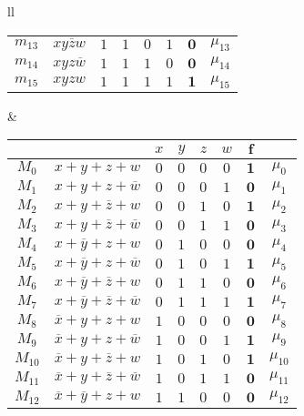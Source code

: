 \documentclass[a4paper]{extarticle}
\begin{document}
\begin{table}[H]
\begin{tabularx}{\textwidth}{ll}
{\begin{tabular}{c|c||cccc||c|c}
          $m_{13}$ & $xy\overline{z}w$ & $1$ & $1$ & $0$ & $1$ & $\boldsymbol{0}$ & $\mu_{13}$\\
          $m_{14}$ & $xyz\overline{w}$ & $1$ & $1$ & $1$ & $0$ & $\boldsymbol{0}$ & $\mu_{14}$\\
          $m_{15}$ & $xyzw$ & $1$ & $1$ & $1$ & $1$ & $\boldsymbol{1}$ & $\mu_{15}$\\
        \end{tabular}
    }
    &
    {
        \noindent
        \begin{tabular}{c|c||cccc||c|c}
          $ $ & $ $ & $x$ & $y$ & $z$ & $w$ & $\boldsymbol{f}$\\
          \hline
          $M_0$ & $x + y + z + w$ & $0$ & $0$ & $0$ & $0$ & $\boldsymbol{1}$ & $\mu_0$\\
          $M_1$ & $x + y + z + \overline{w}$ & $0$ & $0$ & $0$ & $1$ & $\boldsymbol{0}$ & $\mu_1$\\
          $M_2$ & $x + y + \overline{z} + w$ & $0$ & $0$ & $1$ & $0$ & $\boldsymbol{1}$ & $\mu_2$\\
          $M_3$ & $x + y + \overline{z} + \overline{w}$ & $0$ & $0$ & $1$ & $1$ & $\boldsymbol{0}$ & $\mu_3$\\
          $M_4$ & $x + \overline{y} + z + w$ & $0$ & $1$ & $0$ & $0$ & $\boldsymbol{0}$ & $\mu_4$\\
          $M_5$ & $x + \overline{y} + z + \overline{w}$ & $0$ & $1$ & $0$ & $1$ & $\boldsymbol{1}$ & $\mu_5$\\
          $M_6$ & $x + \overline{y} + \overline{z} + w$ & $0$ & $1$ & $1$ & $0$ & $\boldsymbol{0}$ & $\mu_6$\\
          $M_7$ & $x + \overline{y} + \overline{z} + \overline{w}$ & $0$ & $1$ & $1$ & $1$ & $\boldsymbol{1}$ & $\mu_7$\\
          $M_8$ & $\overline{x} + y + z + w$ & $1$ & $0$ & $0$ & $0$ & $\boldsymbol{0}$ & $\mu_8$\\
          $M_9$ & $\overline{x} + y + z + \overline{w}$ & $1$ & $0$ & $0$ & $1$ & $\boldsymbol{1}$ & $\mu_9$\\
          $M_{10}$ & $\overline{x} + y + \overline{z} + w$ & $1$ & $0$ & $1$ & $0$ & $\boldsymbol{1}$ & $\mu_{10}$\\
          $M_{11}$ & $\overline{x} + y + \overline{z} + \overline{w}$ & $1$ & $0$ & $1$ & $1$ & $\boldsymbol{0}$ & $\mu_{11}$\\
          $M_{12}$ & $\overline{x} + \overline{y} + z + w$ & $1$ & $1$ & $0$ & $0$ & $\boldsymbol{0}$ & $\mu_{12}$\\

\end{tabular}}
\end{tabularx}
\end{table}
\end{document}
